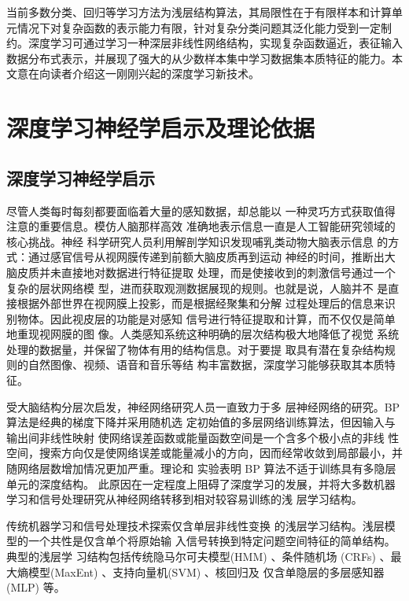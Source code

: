 \documentclass[UTF8]{article}
\begin{document}
	当前多数分类、回归等学习方法为浅层结构算法，其局限性在于有限样本和计算单元情况下对复杂函数的表示能力有限，针对复杂分类问题其泛化能力受到一定制约\cite{v2}。深度学习可通过学习一种深层非线性网络结构，实现复杂函数逼近，表征输入数据分布式表示，并展现了强大的从少数样本集中学习数据集本质特征的能力\cite{v1,v10}。本文意在向读者介绍这一刚刚兴起的深度学习新技术。
	
	\section{深度学习神经学启示及理论依据}
	\subsection{深度学习神经学启示}
	尽管人类每时每刻都要面临着大量的感知数据，却总能以
	一种灵巧方式获取值得注意的重要信息。模仿人脑那样高效
	准确地表示信息一直是人工智能研究领域的核心挑战。神经
	科学研究人员利用解剖学知识发现哺乳类动物大脑表示信息
	的方式：通过感官信号从视网膜传递到前额大脑皮质再到运动
	神经的时间，推断出大脑皮质并未直接地对数据进行特征提取
	处理，而是使接收到的刺激信号通过一个复杂的层状网络模
	型，进而获取观测数据展现的规则\cite{v11,v12,v13}。也就是说，人脑并不
	是直接根据外部世界在视网膜上投影，而是根据经聚集和分解
	过程处理后的信息来识别物体。因此视皮层的功能是对感知
	信号进行特征提取和计算，而不仅仅是简单地重现视网膜的图
	像\cite{v14}。人类感知系统这种明确的层次结构极大地降低了视觉
	系统处理的数据量，并保留了物体有用的结构信息。对于要提
	取具有潜在复杂结构规则的自然图像、视频、语音和音乐等结
	构丰富数据，深度学习能够获取其本质特征。
	
	受大脑结构分层次启发，神经网络研究人员一直致力于多
	层神经网络的研究。BP 算法是经典的梯度下降并采用随机选
	定初始值的多层网络训练算法，但因输入与输出间非线性映射
	使网络误差函数或能量函数空间是一个含多个极小点的非线
	性空间，搜索方向仅是使网络误差或能量减小的方向，因而经常收敛到局部最小，并随网络层数增加情况更加严重。理论和
	实验表明 BP 算法不适于训练具有多隐层单元的深度结构\cite{v15}。
	此原因在一定程度上阻碍了深度学习的发展，并将大多数机器
	学习和信号处理研究从神经网络转移到相对较容易训练的浅
	层学习结构。
	
	传统机器学习和信号处理技术探索仅含单层非线性变换
	的浅层学习结构。浅层模型的一个共性是仅含单个将原始输
	入信号转换到特定问题空间特征的简单结构。典型的浅层学
	习结构包括传统隐马尔可夫模型(HMM) 、条件随机场
	(CRFs) 、最大熵模型(MaxEnt) 、支持向量机(SVM) 、核回归及
	仅含单隐层的多层感知器(MLP) 等。
	
\end{document}
